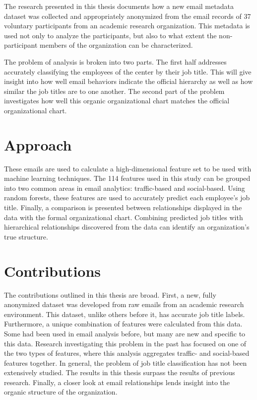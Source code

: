 \documentclass[12pt]{report}
\begin{document}
The research presented in this thesis documents how a new email metadata dataset was collected and appropriately anonymized from the email records of 37 voluntary participants from an academic research organization.
This metadata is used not only to analyze the participants, but also to what extent the non-participant members of the organization can be characterized.


The problem of analysis is broken into two parts.
The first half addresses accurately classifying the employees of the center by their job title.
This will give insight into how well email behaviors indicate the official hierarchy as well as how similar the job titles are to one another.
The second part of the problem investigates how well this organic organizational chart matches the official organizational chart.



\section{Approach}
These emails are used to calculate a high-dimensional feature set to be used with machine learning techniques.
The 114 features used in this study can be grouped into two common areas in email analytics: traffic-based and social-based.
Using random forests, these features are used to accurately predict each employee's job title.
Finally, a comparison is presented between relationships displayed in the data with the formal organizational chart.
Combining predicted job titles with hierarchical relationships discovered from the data can identify an organization's true structure.

\section{Contributions}
The contributions outlined in this thesis are broad.  
First, a new, fully anonymized dataset was developed from raw emails from an academic research environment.  
This dataset, unlike others before it, has accurate job title labels.  
Furthermore, a unique combination of features were calculated from this data.  
Some had been used in email analysis before, but many are new and specific to this data.
Research investigating this problem in the past has focused on one of the two types of features, where this analysis aggregates traffic- and social-based features together.
In general, the problem of job title classification has not been extensively studied.  
The results in this thesis surpass the results of previous research.
Finally, a closer look at email relationships lends insight into the organic structure of the organization.
\end{document}

